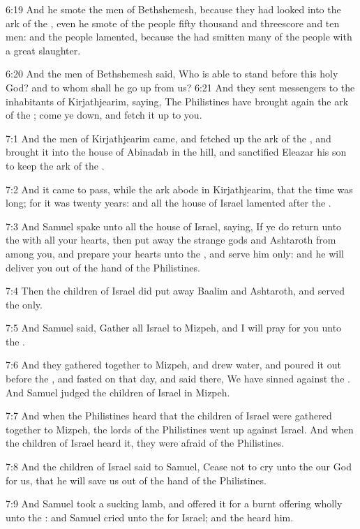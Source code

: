 6:19 And he smote the men of Bethshemesh, because they had looked into
the ark of the \LORD, even he smote of the people fifty thousand and
threescore and ten men: and the people lamented, because the \LORD had
smitten many of the people with a great slaughter.

6:20 And the men of Bethshemesh said, Who is able to stand before this
holy \LORD God? and to whom shall he go up from us?  6:21 And they sent
messengers to the inhabitants of Kirjathjearim, saying, The
Philistines have brought again the ark of the \LORD; come ye down, and
fetch it up to you.

7:1 And the men of Kirjathjearim came, and fetched up the ark of the
\LORD, and brought it into the house of Abinadab in the hill, and
sanctified Eleazar his son to keep the ark of the \LORD.

7:2 And it came to pass, while the ark abode in Kirjathjearim, that
the time was long; for it was twenty years: and all the house of
Israel lamented after the \LORD.

7:3 And Samuel spake unto all the house of Israel, saying, If ye do
return unto the \LORD with all your hearts, then put away the strange
gods and Ashtaroth from among you, and prepare your hearts unto the
\LORD, and serve him only: and he will deliver you out of the hand of
the Philistines.

7:4 Then the children of Israel did put away Baalim and Ashtaroth, and
served the \LORD only.

7:5 And Samuel said, Gather all Israel to Mizpeh, and I will pray for
you unto the \LORD.

7:6 And they gathered together to Mizpeh, and drew water, and poured
it out before the \LORD, and fasted on that day, and said there, We
have sinned against the \LORD. And Samuel judged the children of Israel
in Mizpeh.

7:7 And when the Philistines heard that the children of Israel were
gathered together to Mizpeh, the lords of the Philistines went up
against Israel. And when the children of Israel heard it, they were
afraid of the Philistines.

7:8 And the children of Israel said to Samuel, Cease not to cry unto
the \LORD our God for us, that he will save us out of the hand of the
Philistines.

7:9 And Samuel took a sucking lamb, and offered it for a burnt
offering wholly unto the \LORD: and Samuel cried unto the \LORD for
Israel; and the \LORD heard him.

